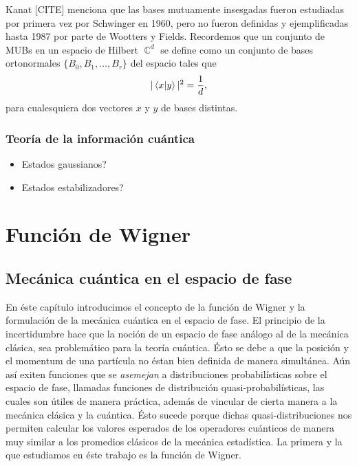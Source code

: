\documentclass[a4paper]{report}
\DeclareMathOperator{\C}{\mathbb{C}}
\begin{document}
  Kanat [CITE] menciona que las bases mutuamente insesgadas
  fueron estudiadas por primera vez por Schwinger en 1960,
  pero no fueron definidas y ejemplificadas hasta 1987 por
  parte de Wootters y Fields. Recordemos que un conjunto de
  MUBs en un espacio de Hilbert $\C^{d}$ se define como un
  conjunto de bases ortonormales $\{B_0,B_1,\ldots,B_r\}$ 
  del espacio tales que
  \[
    |\braket{x|y}|^2 = \frac{1}{d},
  \] 
  para cualesquiera dos vectores $x$ y $y$ de bases
  distintas. 

  \subsection{Teoría de la información cuántica}

  \begin{itemize}
    \item Estados gaussianos?
    \item Estados estabilizadores?
  \end{itemize}

  \chapter{Función de Wigner}

  \section{Mecánica cuántica en el espacio de fase}

  En éste capítulo introducimos el concepto de la función de
  Wigner y la formulación de la mecánica cuántica en el
  espacio de fase. El principio de la incertidumbre hace que
  la noción de un espacio de fase análogo al de la mecánica
  clásica, sea problemático para la teoría cuántica. Ésto se
  debe a que la posición y el momentum de una partícula no
  éstan bien definida de manera simultánea. Aún así exiten
  funciones que se \textit{asemejan} a distribuciones
  probabilísticas sobre el espacio de fase, llamadas
  funciones de distribución quasi-probabilísticas, las
  cuales son útiles de manera práctica, además de vincular
  de cierta manera a la mecánica clásica y la cuántica. Ésto
  sucede porque dichas quasi-distribuciones nos permiten
  calcular los valores esperados de los operadores cuánticos
  de manera muy similar a los promedios clásicos de la
  mecánica estadística. La primera y la que estudiamos en
  éste trabajo es la función de Wigner.
\end{document}
